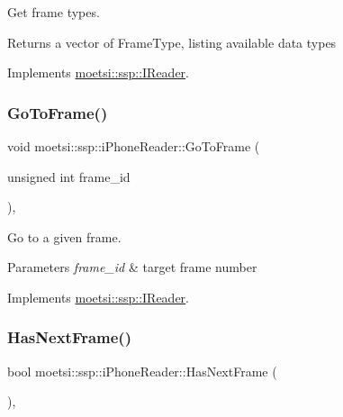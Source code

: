 Get frame types. 

\begin{DoxyReturn}{Returns}
a vector of Frame\+Type, listing available data types 
\end{DoxyReturn}


Implements \hyperlink{classmoetsi_1_1ssp_1_1IReader_a4116c1931fde7bd66133934ffdca1cce}{moetsi\+::ssp\+::\+I\+Reader}.

\mbox{\label{classmoetsi_1_1ssp_1_1iPhoneReader_a27b6dea97e4c4db8e4e749cc9e30e7ca}} 
\subsubsection{\texorpdfstring{Go\+To\+Frame()}{GoToFrame()}}
{\footnotesize\ttfamily void moetsi\+::ssp\+::i\+Phone\+Reader\+::\+Go\+To\+Frame (\begin{DoxyParamCaption}\item[{unsigned int}]{frame\+\_\+id }\end{DoxyParamCaption})\hspace{0.3cm}{\ttfamily [override]}, {\ttfamily [virtual]}}



Go to a given frame. 


\begin{DoxyParams}{Parameters}
{\em frame\+\_\+id} & target frame number \\
\hline
\end{DoxyParams}


Implements \hyperlink{classmoetsi_1_1ssp_1_1IReader_a6f1be3c06538992cca6d550bd9566681}{moetsi\+::ssp\+::\+I\+Reader}.

\mbox{\label{classmoetsi_1_1ssp_1_1iPhoneReader_a35ca55a03a9fb7b559f9381b11f53bfe}} 
\subsubsection{\texorpdfstring{Has\+Next\+Frame()}{HasNextFrame()}}
{\footnotesize\ttfamily bool moetsi\+::ssp\+::i\+Phone\+Reader\+::\+Has\+Next\+Frame (\begin{DoxyParamCaption}{ }\end{DoxyParamCaption})\hspace{0.3cm}{\ttfamily [override]}, {\ttfamily [virtual]}}



